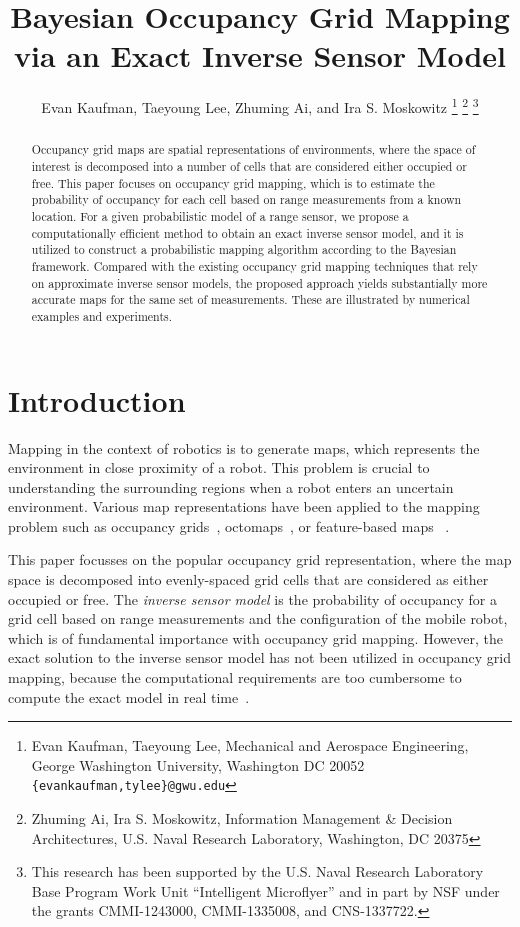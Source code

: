 \documentclass[letterpaper, 10pt, conference]{ieeeconf}
\title{\LARGE \bf
Bayesian Occupancy Grid Mapping via an Exact Inverse Sensor Model}
\author{Evan Kaufman, Taeyoung Lee, Zhuming Ai, and Ira S. Moskowitz%
\thanks{Evan Kaufman, Taeyoung Lee, Mechanical and Aerospace Engineering, George Washington University, Washington DC 20052 {\tt \{evankaufman,tylee\}@gwu.edu}}
\thanks{Zhuming Ai, Ira S. Moskowitz, Information Management \& Decision Architectures, U.S. Naval Research Laboratory,  Washington, DC 20375}
\thanks{This research has been supported by the U.S. Naval Research Laboratory Base Program Work Unit ``Intelligent Microflyer'' and in part by NSF under the grants CMMI-1243000, CMMI-1335008, and CNS-1337722.}
}
\newcommand{\EditTL}[1]{{\color{red}\protect #1}}
\begin{document}
\allowdisplaybreaks


\maketitle \thispagestyle{empty} \pagestyle{empty}

\begin{abstract}
Occupancy grid maps are spatial representations of environments, where the space of interest is decomposed into a number of cells that are considered either occupied or free. This paper focuses on occupancy grid mapping, which is to estimate the probability of occupancy for each cell based on range measurements from a known location. For a given probabilistic model of a range sensor, we propose a computationally efficient method to obtain an exact inverse sensor model, and it is utilized to construct a probabilistic mapping algorithm according to the Bayesian framework. Compared with the existing occupancy grid mapping techniques that rely on approximate inverse sensor models, the proposed approach yields substantially more accurate maps for the same set of measurements. These are illustrated by numerical examples and experiments. 
\end{abstract}

\section{Introduction}

Mapping in the context of robotics is to generate maps, which represents the environment in close proximity of a robot. This problem is crucial to understanding the surrounding regions when a robot enters an uncertain environment.
Various map representations have been applied to the mapping problem such as occupancy grids~\cite{WolSuk05}, octomaps~\cite{WurHorBenStaBur10}, or feature-based maps%
~\cite{MonThrKolWeg02}.

This paper focusses on the popular occupancy grid representation, where the map space is decomposed into evenly-spaced grid cells that are considered as either occupied or free.
The \emph{inverse sensor model} is the probability of occupancy for a grid cell based on range measurements and the configuration of the mobile robot, which is of fundamental importance with occupancy grid mapping. However, the exact solution to the inverse sensor model has not been utilized in occupancy grid mapping, because the computational requirements are too cumbersome to compute the exact model in real time~\cite{ThrBurFox05}.
\end{document}
